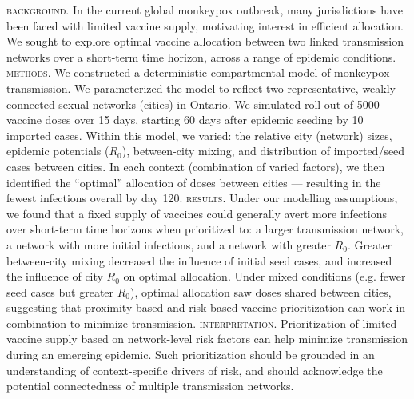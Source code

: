 \renewcommand{\emph}[1]{\textsc{\MakeLowercase{#1}}}
\emph{Background.}
In the current global monkeypox outbreak,
many jurisdictions have been faced with limited vaccine supply,
motivating interest in efficient allocation.
We sought to explore optimal vaccine allocation between two linked transmission networks
over a short-term time horizon, across a range of epidemic conditions.
\emph{Methods.}
We constructed a deterministic compartmental \SVEIR model of monkeypox transmission.
We parameterized the model to reflect
two representative, weakly connected \GBMSM sexual networks (cities) in Ontario.
We simulated roll-out of 5000 vaccine doses over 15 days,
starting 60 days after epidemic seeding by 10 imported cases.
Within this model, we varied:
the relative city (network) sizes,
epidemic potentials ($R_0$),
between-city mixing,
and distribution of imported/seed cases between cities.
In each context (combination of varied factors),
we then identified the ``optimal'' allocation of doses between cities
--- resulting in the fewest infections overall by day 120.
\emph{Results.}
Under our modelling assumptions, we found that a fixed supply of vaccines
could generally avert more infections over short-term time horizons when prioritized to:
a larger transmission network,
a network with more initial infections, and
a network with greater $R_0$.
Greater between-city mixing decreased the influence of initial seed cases, and
increased the influence of city $R_0$ on optimal allocation.
Under mixed conditions (e.g. fewer seed cases but greater $R_0$),
optimal allocation saw doses shared between cities,
suggesting that proximity-based and risk-based vaccine prioritization
can work in combination to minimize transmission.
\emph{Interpretation.}
Prioritization of limited vaccine supply based on network-level risk factors
can help minimize transmission during an emerging epidemic.
Such prioritization should be grounded in an understanding of context-specific drivers of risk,
and should acknowledge the potential connectedness of multiple transmission networks.
